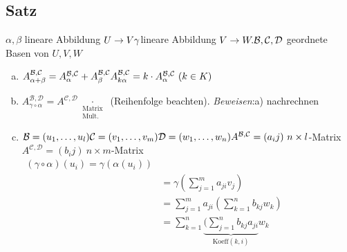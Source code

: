 \subsection{Satz}\label{sec:\thesubsection}
$\alpha,\beta$ lineare Abbildung $U \to V\\
\gamma $lineare Abbildung $V \to W.\\
\mathcal{B,C,D}$ geordnete Basen von $U,V,W$
\begin{enumerate}[a)]
\item $A^{\mathcal{B,C}}_{\alpha+\beta} = A^{\mathcal{B,C}}_\alpha + A^{\mathcal{B,C}}_\beta\\
A^{\mathcal{B,C}}_{k\alpha} = k \cdot A^{\mathcal{B,C}}_\alpha\ (k \in K)$
\item \( A^{\mathcal{B,D}}_{\gamma \circ \alpha} = A^{\mathcal{C,D}} \underset{\substack{\text{Matrix}\\\text{Mult.} }}{\cdot} \) (Reihenfolge beachten).
\emph{Beweisen}:a) nachrechnen
\item $\mathcal{B} = (u_1,\ldots,u_l)\\
\mathcal{C} = (v_1,\ldots,v_m)
\mathcal{D} = (w_1,\ldots,w_n)\\
A^{\mathcal{B,C}} = (a_ij)\ n \times l$-Matrix\\
$A^{\mathcal{C,D}} = (b_ij)\ n \times m$-Matrix\\
$\begin{array}{ll}
(\gamma\circ\alpha)(u_i) = \gamma(\alpha(u_i))\\
&= \gamma(\sum\limits_{j=1}^ma_{ji}v_j)\\
&= \sum\limits_{j=1}^{m}a_{ji} (\sum\limits_{k=1}^{n}b_{kj}w_k)\\
&= \sum\limits^{n}_{k=1}\underbrace{(\sum\limits^{n}_{j=1}b_{kj}a_{ji}}_{\text{Koeff}(k,i)}w_k
\end{array}$
\end{enumerate}
